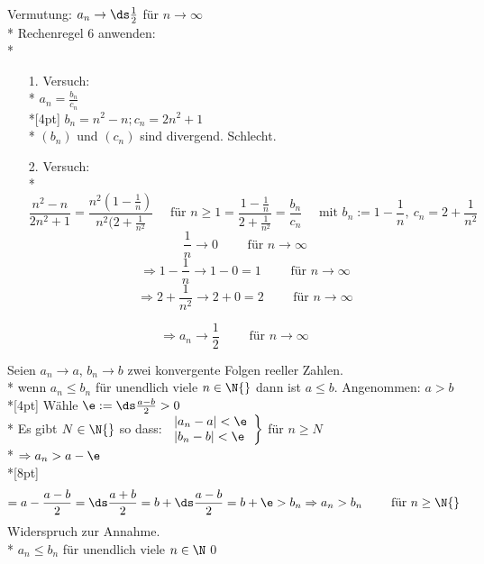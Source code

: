 \vspace{5mm}
Vermutung: $a_n \to \ds\frac{1}{2}$ für $n \to ∞$\\*
Rechenregel 6 anwenden:\\*
\begin{itemize}
\item[1.]{Versuch:\\*
$a_n = \frac{b_n}{c_n}$\\*[4pt]
$b_n = n^2 -n; c_n = 2n^2 + 1$\\*
$(b_n)$ und $(c_n)$ sind divergend. Schlecht.}
\item[2.]{Versuch:\\*
$$\frac{n^2 - n}{2n^2 + 1} = \frac{n^2(1 - \frac{1}{n})}{n^2(2 + \frac{1}{n^2}}\quad\text{ für }n \geq 1= \frac{1-\frac{1}{n}}{2 +\frac{1}{n^2}}=\frac{b_n}{c_n}\quad\text{ mit }b_n:=1-\frac{1}{n},\ c_n = 2 + \frac{1}{n^2}$$
$$\frac{1}{n} \to 0\qquad\text{ für }n \to ∞ $$
$$\Rightarrow 1 - \frac{1}{n} \to 1 - 0 = 1\qquad\text{ für }n \to ∞$$
$$\Rightarrow 2 +\frac{1}{n^2}\to 2 + 0 = 2\qquad\text{ für }n \to ∞$$}
\end{itemize}
$$\Rightarrow a_n \to \frac{1}{2}\qquad\text{ für }n \to ∞$$

Seien $a_n \to a$, $b_n \to b$ zwei konvergente Folgen reeller Zahlen.\\*
wenn $a_n \leq b_n$ für unendlich viele $n \in \N{}$ dann ist $a \leq b$.
\bew
Angenommen: $a > b$\\*[4pt]
Wähle $\e := \ds\frac{a - b}{2} > 0$\\*
Es gibt $N \in \N{}$ so dass:
$\left.
\begin{array}{ll}
| a_n - a | < \e \\*
| b_n - b | < \e
\end{array} \right\rbrace$ für $n \geq N$\\*
$\Rightarrow a_n > a - \e$\\*[8pt]
$$= a - \frac{a - b}{2} = \ds\frac{a + b}{2} = b + \ds\frac{a - b}{2}= b + \e > b_n \Rightarrow a_n > b_n\qquad\text{ für }n \geq \N{}$$
Widerspruch zur Annahme.\\*
$a_n \leq b_n$ für unendlich viele $n \in \N$\qed


